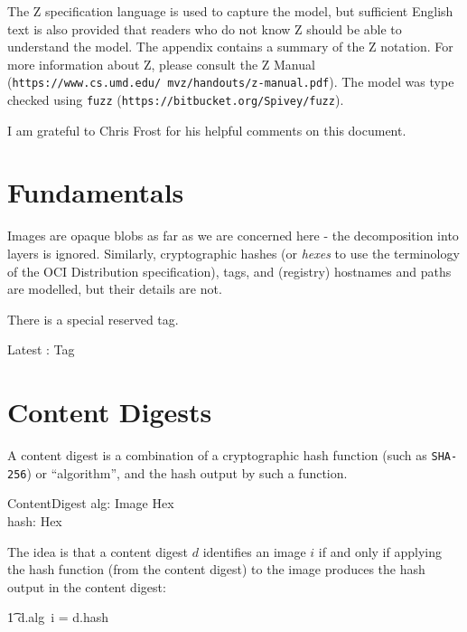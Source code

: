 \documentclass[a4paper,twoside,12pt]{article}
\begin{document}
The Z specification language is used to capture the model, but sufficient English text is also provided that readers who do not know Z should be able to understand the model. The appendix contains a summary of the Z notation.
For more information about Z, please consult the Z Manual (\texttt{https://www.cs.umd.edu/~mvz/handouts/z-manual.pdf}).
The model was type checked using \texttt{fuzz} (\texttt{https://bitbucket.org/Spivey/fuzz}).

I am grateful to Chris Frost for his helpful comments on this document.

\section{Fundamentals}

Images are opaque blobs as far as we are concerned here - the decomposition into layers is ignored.
Similarly, cryptographic hashes (or \textit{hexes} to use the terminology of the OCI Distribution specification), tags, and (registry) hostnames and paths are modelled, but their details are not.
\begin{zed}
\end{zed}

There is a special reserved tag.
\begin{axdef}
    Latest : Tag
\end{axdef}

\newpage
\section{Content Digests}

A content digest is a combination of a cryptographic hash function (such as \texttt{SHA-256}) or ``algorithm'', and the hash output by such a function. 
\begin{schema}{ContentDigest}
    alg: Image \fun Hex \\
    hash: Hex \\ 
\end{schema}

The idea is that a content digest $d$ identifies an image $i$ if and only if applying the hash function (from the content digest) to the image produces the hash output in the content digest:\\
\begin{zed}
\t1 d.alg~i = d.hash
\end{zed}
\end{document}

